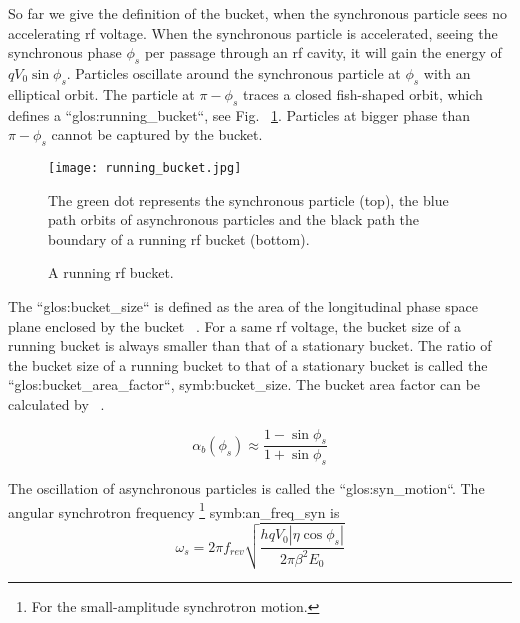So far we give the definition of the bucket, when the synchronous particle sees no accelerating rf voltage. When the synchronous particle is accelerated, seeing the synchronous phase $\phi_{\mathit{s}}$ per passage through an rf cavity, it will gain the energy of $qV_0\sin\phi_{\mathit{s}}$. %
Particles oscillate around the synchronous particle at $\phi_{\mathit{s}}$ with an elliptical orbit. The particle at $\pi-\phi_{\mathit{s}}$ traces a closed fish-shaped orbit, which defines a ``\gls{glos:running_bucket}``, see Fig. ~\ref{running_bucket}. Particles at bigger phase than $\pi-\phi_{\mathit{s}}$ cannot be captured by the bucket.
\begin{figure}[!htb]
   \centering   
   \texttt{[image: running\_bucket.jpg]}
   \caption{A running rf bucket.}{The green dot represents the synchronous particle (top), the blue path orbits of asynchronous particles and the black path the boundary of a running rf bucket (bottom).}
   \label{running_bucket}
\end{figure} 

The ``\gls{glos:bucket_size}`` is defined as the area of the longitudinal phase space plane enclosed by the bucket ~\cite{lee_accelerator_2011}. For a same rf voltage, the bucket size of a running bucket is always smaller than that of a stationary bucket. The ratio of the bucket size of a running bucket to that of a stationary bucket is called the ``\gls{glos:bucket_area_factor}``, \gls{symb:bucket_size}. The bucket area factor can be calculated by ~\cite{lee_accelerator_2011}.

\begin{equation}
\alpha_b(\phi_{s})\approx \frac{1-\sin\phi_{s}}{1+\sin\phi_{s}}
\label{eq:buckt_area_factor}
\end{equation} 

The oscillation of asynchronous particles is called the ``\gls{glos:syn_motion}``. The angular synchrotron frequency \footnote{For the small-amplitude synchrotron motion.} \gls{symb:an_freq_syn} is ~\cite{lee_accelerator_2011}
\begin{equation}
\omega_{s}=2\pi f_{\mathit{rev}}\sqrt{\frac{hqV_0|\eta\cos\phi_{s}|}{2\pi\beta^2E_0}}
\label{eq:synchfreq}
\end{equation} 

